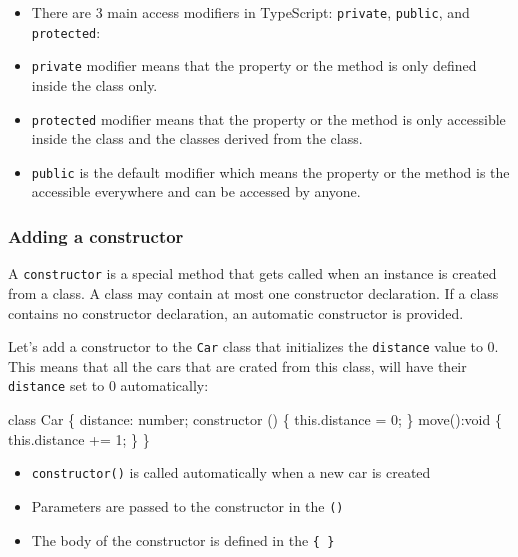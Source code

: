 \documentclass[12pt,]{article}
\newenvironment{Shaded}{}{}
\newcommand{\KeywordTok}[1]{\textcolor[rgb]{0.00,0.00,1.00}{{#1}}}
\newcommand{\DataTypeTok}[1]{{#1}}
\newcommand{\DecValTok}[1]{{#1}}
\newcommand{\FunctionTok}[1]{{#1}}
\newcommand{\NormalTok}[1]{{#1}}
\providecommand{\tightlist}{%
  \setlength{\itemsep}{0pt}\setlength{\parskip}{0pt}}
\begin{document}
\begin{itemize}
\item
  There are 3 main access modifiers in TypeScript: \texttt{private},
  \texttt{public}, and \texttt{protected}:
\item
  \texttt{private} modifier means that the property or the method is
  only defined inside the class only.
\item
  \texttt{protected} modifier means that the property or the method is
  only accessible inside the class and the classes derived from the
  class.
\item
  \texttt{public} is the default modifier which means the property or
  the method is the accessible everywhere and can be accessed by anyone.
\end{itemize}

\subsubsection{Adding a constructor}\label{adding-a-constructor}

A \texttt{constructor} is a special method that gets called when an
instance is created from a class. A class may contain at most one
constructor declaration. If a class contains no constructor declaration,
an automatic constructor is provided.

Let's add a constructor to the \texttt{Car} class that initializes the
\texttt{distance} value to 0. This means that all the cars that are
crated from this class, will have their \texttt{distance} set to 0
automatically:

\begin{Shaded}
\begin{Highlighting}[numbers=left,,]
\KeywordTok{class} \NormalTok{Car \{}
  \NormalTok{distance: number;}
  \FunctionTok{constructor} \NormalTok{() \{}
    \KeywordTok{this}\NormalTok{.}\FunctionTok{distance} \NormalTok{= }\DecValTok{0}\NormalTok{;}
  \NormalTok{\}}
  \FunctionTok{move}\NormalTok{():}\DataTypeTok{void} \NormalTok{\{}
    \KeywordTok{this}\NormalTok{.}\FunctionTok{distance} \NormalTok{+= }\DecValTok{1}\NormalTok{;}
  \NormalTok{\}}
\NormalTok{\}}
\end{Highlighting}
\end{Shaded}

\begin{itemize}
\tightlist
\item
  \texttt{constructor()} is called automatically when a new car is
  created
\item
  Parameters are passed to the constructor in the \texttt{()}
\item
  The body of the constructor is defined in the \texttt{\{\ \}}
\end{itemize}
\end{document}
